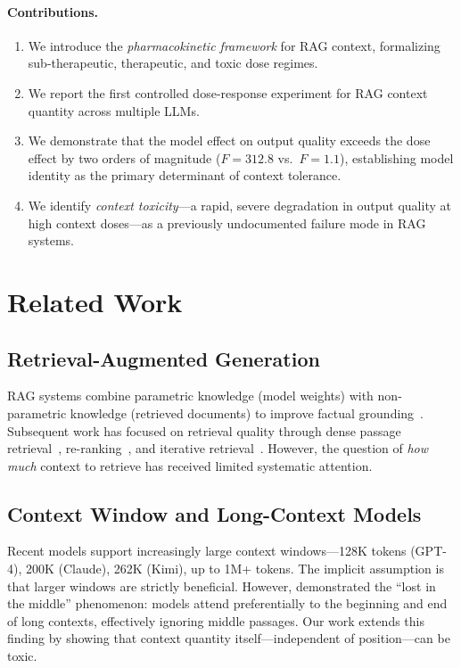\documentclass[11pt,a4paper]{article}
\begin{document}
\paragraph{Contributions.}
\begin{enumerate}[leftmargin=*, itemsep=2pt]
  \item We introduce the \emph{pharmacokinetic framework} for RAG context, formalizing sub-therapeutic, therapeutic, and toxic dose regimes.
  \item We report the first controlled dose-response experiment for RAG context quantity across multiple LLMs.
  \item We demonstrate that the model effect on output quality exceeds the dose effect by two orders of magnitude ($F = 312.8$ vs.\ $F = 1.1$), establishing model identity as the primary determinant of context tolerance.
  \item We identify \emph{context toxicity}---a rapid, severe degradation in output quality at high context doses---as a previously undocumented failure mode in RAG systems.
\end{enumerate}

\section{Related Work}

\subsection{Retrieval-Augmented Generation}
RAG systems combine parametric knowledge (model weights) with non-parametric knowledge (retrieved documents) to improve factual grounding~\citep{lewis2020rag}. Subsequent work has focused on retrieval quality through dense passage retrieval~\citep{karpukhin2020dpr}, re-ranking~\citep{nogueira2020reranking}, and iterative retrieval~\citep{jiang2023active}. However, the question of \emph{how much} context to retrieve has received limited systematic attention.

\subsection{Context Window and Long-Context Models}
Recent models support increasingly large context windows---128K tokens (GPT-4), 200K (Claude), 262K (Kimi), up to 1M+ tokens. The implicit assumption is that larger windows are strictly beneficial. However, \citet{liu2024lost} demonstrated the ``lost in the middle'' phenomenon: models attend preferentially to the beginning and end of long contexts, effectively ignoring middle passages. Our work extends this finding by showing that context quantity itself---independent of position---can be toxic.
\end{document}
